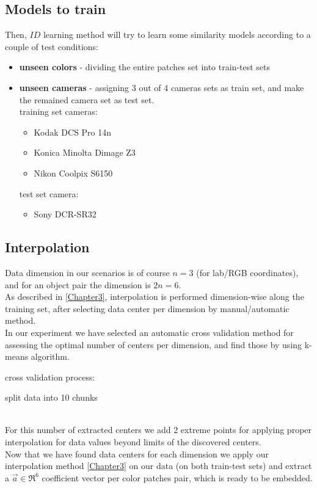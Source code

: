\subsection{Models to train}
Then, $ID$ learning method will try to learn some similarity models according to a couple of test conditions:

\begin{itemize}
	\item \textbf{unseen colors} - dividing the entire patches set into train-test sets
	\item \textbf{unseen cameras} - assigning 3 out of 4 cameras sets as train set, and make the remained camera set as test set. \\
		training set cameras:
		\begin{itemize}
			\item Kodak DCS	Pro 14n
			\item Konica Minolta Dimage Z3
			\item Nikon Coolpix S6150
		\end{itemize}	
		
		test set camera:	
		\begin{itemize}
			\item Sony DCR-SR32
		\end{itemize}
		
\end{itemize}

\subsection{Interpolation}
Data dimension in our scenarios is of course $n=3$ (for lab/RGB \cite{RGB} coordinates), and for an object pair the dimension is $2n=6$. \\
As described in \ref{Chapter3}, interpolation is performed dimension-wise along the training set, after selecting data center per dimension by manual/automatic method.
\\
In our experiment we have selected an automatic cross validation \cite{cross validation} method for assessing the optimal number of centers per dimension, and find those by using k-means \cite{kmeans} algorithm.

cross validation process:
\begin{algorithm}
	split data into 10 chunks
\end{algorithm}
\\
For this number of extracted centers we add 2 extreme points for applying proper interpolation for data values beyond limits of the discovered centers.
\\
Now that we have found data centers for each dimension we apply our interpolation method \ref{Chapter3} on our data (on both train-test sets) and extract a $\overrightarrow{a} \in \Re^6$ coefficient vector per color patches pair, which is ready to be embedded.


